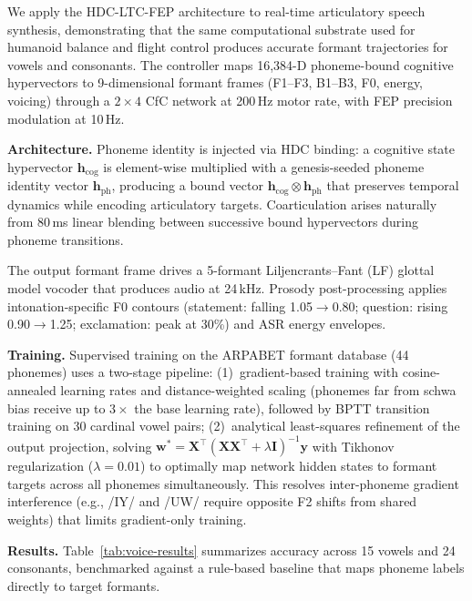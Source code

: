 \documentclass[10pt,letterpaper]{article}
\begin{document}
We apply the HDC-LTC-FEP architecture to real-time articulatory speech synthesis, demonstrating that the same computational substrate used for humanoid balance and flight control produces accurate formant trajectories for vowels and consonants. The controller maps 16,384-D phoneme-bound cognitive hypervectors to 9-dimensional formant frames (F1--F3, B1--B3, F0, energy, voicing) through a $2{\times}4$ CfC network at 200\,Hz motor rate, with FEP precision modulation at 10\,Hz.

\textbf{Architecture.} Phoneme identity is injected via HDC binding: a cognitive state hypervector $\mathbf{h}_{\text{cog}}$ is element-wise multiplied with a genesis-seeded phoneme identity vector $\mathbf{h}_{\text{ph}}$, producing a bound vector $\mathbf{h}_{\text{cog}} \otimes \mathbf{h}_{\text{ph}}$ that preserves temporal dynamics while encoding articulatory targets. Coarticulation arises naturally from 80\,ms linear blending between successive bound hypervectors during phoneme transitions.

The output formant frame drives a 5-formant Liljencrants--Fant (LF) glottal model vocoder that produces audio at 24\,kHz. Prosody post-processing applies intonation-specific F0 contours (statement: falling 1.05$\to$0.80; question: rising 0.90$\to$1.25; exclamation: peak at 30\%) and ASR energy envelopes.

\textbf{Training.} Supervised training on the ARPABET formant database (44 phonemes) uses a two-stage pipeline: (1)~gradient-based training with cosine-annealed learning rates and distance-weighted scaling (phonemes far from schwa bias receive up to $3{\times}$ the base learning rate), followed by BPTT transition training on 30 cardinal vowel pairs; (2)~analytical least-squares refinement of the output projection, solving $\mathbf{w}^* = \mathbf{X}^\top(\mathbf{X}\mathbf{X}^\top + \lambda\mathbf{I})^{-1}\mathbf{y}$ with Tikhonov regularization ($\lambda=0.01$) to optimally map network hidden states to formant targets across all phonemes simultaneously. This resolves inter-phoneme gradient interference (e.g., /IY/ and /UW/ require opposite F2 shifts from shared weights) that limits gradient-only training.

\textbf{Results.} Table~\ref{tab:voice-results} summarizes accuracy across 15 vowels and 24 consonants, benchmarked against a rule-based baseline that maps phoneme labels directly to target formants.
\end{document}
